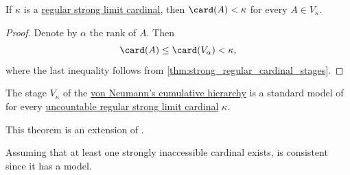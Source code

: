 \begin{corollary}\label{thm:strong_regular_cardinal_stage_cardinality}
  If \( \kappa \) is a \hyperref[rem:strongly_inaccessible_cardinal]{regular strong limit cardinal}, then \( \card(A) < \kappa \) for every \( A \in V_\kappa \).
\end{corollary}
\begin{proof}
  Denote by \( \alpha \) the rank of \( A \). Then
  \begin{equation*}
    \card(A) \leq \card(V_\alpha) < \kappa,
  \end{equation*}
  where the last inequality follows from \cref{thm:strong_regular_cardinal_stages}.
\end{proof}

\begin{theorem}\label{thm:cumulative_hierarchy_model_of_zfc}
  The stage \( V_\kappa \) of the \hyperref[def:cumulative_hierarchy]{von Neumann's cumulative hierarchy} is a standard model of  for every \hyperref[rem:strongly_inaccessible_cardinal]{uncountable regular strong limit cardinal} \( \kappa \).
\end{theorem}
\begin{comments}
  \item This theorem is an extension of .
  \item Assuming that at least one strongly inaccessible cardinal exists,  is consistent since it has a model.
\end{comments}
